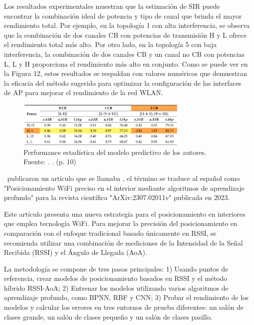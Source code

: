Los resultados experimentales muestran que la estimación de SIR puede encontrar la combinación ideal de potencia y tipo de canal que brinda el mayor rendimiento total. Por ejemplo, en la topología 1 con alta interferencia, se observa que la combinación de dos canales CB con potencias de transmisión H y L ofrece el rendimiento total más alto. Por otro lado, en la topología 5 con baja interferencia, la combinación de dos canales CB y un canal no CB con potencias L, L y H proporciona el rendimiento más alto en conjunto. Como se puede ver en la Figura 12, estos resultados se respaldan con valores numéricos que demuestran la eficacia del método sugerido para optimizar la configuración de las interfaces de AP para mejorar el rendimiento de la red WLAN.

\begin{figure}[!ht]
	\begin{center}
		\includegraphics[width=0.75\textwidth]{2/figures/akhter2023.png}
		\caption[Performance estadística del modelo predictivo de los autores]{Performance estadística del modelo predictivo de los autores.\\
		Fuente: \cite{pr_akhter2023interfacesetup}. . (p. 10)}
		\label{2:fig120}
	\end{center}
\end{figure}

\clearpage
\cite{pr_cai2023precisewifi} publicaron un artículo que se llamaba , el término se traduce al español como "Posicionamiento WiFi preciso en el interior mediante algoritmos de aprendizaje profundo" para la revista científica "ArXiv:2307.02011v" publicada en 2023.

Este artículo presenta una nueva estrategia para el posicionamiento en interiores que emplea tecnología WiFi. Para mejorar la precisión del posicionamiento en comparación con el enfoque tradicional basado únicamente en RSSI, se recomienda utilizar una combinación de mediciones de la Intensidad de la Señal Recibida (RSSI) y el Ángulo de Llegada (AoA).

La metodología se compone de tres pasos principales: 1) Usando puntos de referencia, crear modelos de posicionamiento basados en RSSI y el método híbrido RSSI-AoA; 2) Entrenar los modelos utilizando varios algoritmos de aprendizaje profundo, como BPNN, RBF y CNN; 3) Probar el rendimiento de los modelos y calcular los errores en tres entornos de prueba diferentes: un salón de clases grande, un salón de clases pequeño y un salón de clases pasillo.

